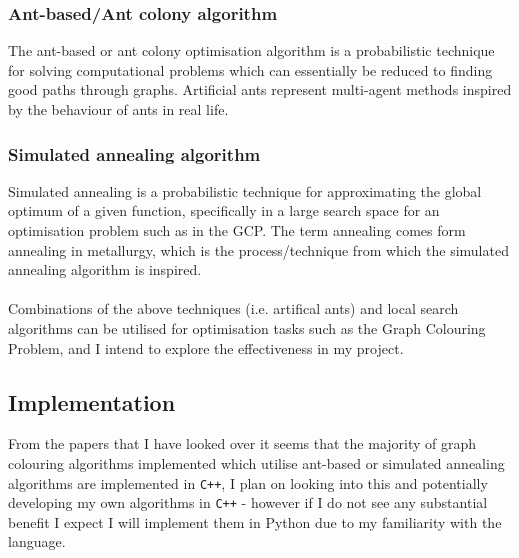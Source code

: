 \documentclass[12pt, a4paper]{article}
\begin{document}
{\subsubsection*{Ant-based/Ant  colony algorithm}
\hspace{\parindent}The ant-based or ant colony optimisation algorithm is a probabilistic technique for solving computational problems which can essentially be reduced to finding good paths through graphs. Artificial ants represent multi-agent methods inspired by the behaviour of ants in real life. 
\subsubsection*{Simulated annealing algorithm}
\hspace{\parindent}Simulated annealing is a probabilistic technique for approximating the global optimum of a given function, specifically in a large search space for an optimisation problem such as in the GCP. The term annealing comes form annealing in metallurgy, which is the process/technique from which the simulated annealing algorithm is inspired.\\ \\
\hspace{\parindent}Combinations of the above techniques (i.e. artifical ants) and local search algorithms can be utilised for optimisation tasks such as the Graph Colouring Problem, and I intend to explore the effectiveness in my project.
\subsection*{Implementation}
\hspace{\parindent} From the papers that I have looked over it seems that the majority of graph colouring algorithms implemented which utilise ant-based or simulated annealing algorithms are implemented in \verb!C++!, I plan on looking into this and potentially developing my own algorithms in \verb!C++! - however if I do not see any substantial benefit I expect I will implement them in  Python due to my familiarity with the language.
}
\end{document}
